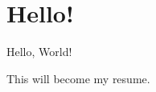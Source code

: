 \documentclass[a4paper]{article}
\begin{document}
\section{Hello!}

Hello, World!

This will become my resume.
\end{document}
